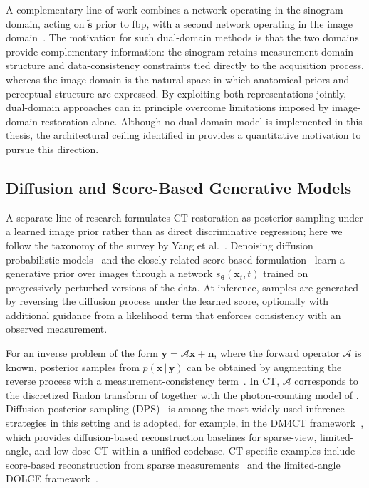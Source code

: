 A complementary line of work combines a network operating in the sinogram domain, acting on $\tilde{\boldsymbol{s}}$ prior to \gls{fbp}, with a second network operating in the image domain~\cite{Wang2020, Zhang2022, Lin2019DuDoNet}. The motivation for such dual-domain methods is that the two domains provide complementary information: the sinogram retains measurement-domain structure and data-consistency constraints tied directly to the acquisition process, whereas the image domain is the natural space in which anatomical priors and perceptual structure are expressed. By exploiting both representations jointly, dual-domain approaches can in principle overcome limitations imposed by image-domain restoration alone. Although no dual-domain model is implemented in this thesis, the architectural ceiling identified in  provides a quantitative motivation to pursue this direction.

\subsection{Diffusion and Score-Based Generative Models}
\label{subsec:bg_diffusion}

A separate line of research formulates CT restoration as posterior sampling under a learned image prior rather than as direct discriminative regression; here we follow the taxonomy of the survey by Yang et al.~\cite{Yang2024DiffusionSurvey}. Denoising diffusion probabilistic models~\cite{Ho2020} and the closely related score-based formulation~\cite{SongErmon2019, Song2021} learn a generative prior over images through a network \(s_{\boldsymbol{\theta}}(\boldsymbol{x}_t, t)\) trained on progressively perturbed versions of the data. At inference, samples are generated by reversing the diffusion process under the learned score, optionally with additional guidance from a likelihood term that enforces consistency with an observed measurement.

For an inverse problem of the form \(\boldsymbol{y} = \mathcal{A}\boldsymbol{x} + \boldsymbol{n}\), where the forward operator \(\mathcal{A}\) is known, posterior samples from \(p(\boldsymbol{x}\,|\,\boldsymbol{y})\) can be obtained by augmenting the reverse process with a measurement-consistency term~\cite{Song2022, Chung2023}. In CT, \(\mathcal{A}\) corresponds to the discretized Radon transform of  together with the photon-counting model of . Diffusion posterior sampling (DPS)~\cite{Chung2023} is among the most widely used inference strategies in this setting and is adopted, for example, in the DM4CT framework~\cite{DM4CT2025}, which provides diffusion-based reconstruction baselines for sparse-view, limited-angle, and low-dose CT within a unified codebase. CT-specific examples include score-based reconstruction from sparse measurements~\cite{Song2022} and the limited-angle DOLCE framework~\cite{Liu2023DOLCE}.

